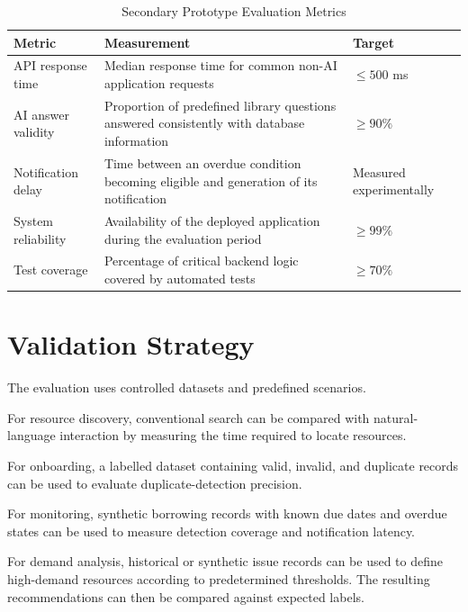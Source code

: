 \documentclass{tietreport}
\begin{document}
\begin{table}[H]
\centering
\caption{Secondary Prototype Evaluation Metrics}
\label{tab:secondarymetrics}

\begin{tabularx}{\textwidth}{>{\raggedright\arraybackslash}p{3.5cm}
                              X
                              >{\centering\arraybackslash}p{2.5cm}}
\toprule
\textbf{Metric} & \textbf{Measurement} & \textbf{Target} \\
\midrule

API response time &
Median response time for common non-AI application requests &
$\leq 500$ ms \\

AI answer validity &
Proportion of predefined library questions answered consistently with
database information &
$\geq 90\%$ \\

Notification delay &
Time between an overdue condition becoming eligible and generation of
its notification &
Measured experimentally \\

System reliability &
Availability of the deployed application during the evaluation period &
$\geq 99\%$ \\

Test coverage &
Percentage of critical backend logic covered by automated tests &
$\geq 70\%$ \\

\bottomrule
\end{tabularx}
\end{table}

\section{Validation Strategy}

The evaluation uses controlled datasets and predefined scenarios.

For resource discovery, conventional search can be compared with
natural-language interaction by measuring the time required to locate
resources.

For onboarding, a labelled dataset containing valid, invalid, and
duplicate records can be used to evaluate duplicate-detection precision.

For monitoring, synthetic borrowing records with known due dates and
overdue states can be used to measure detection coverage and notification
latency.

For demand analysis, historical or synthetic issue records can be used to
define high-demand resources according to predetermined thresholds. The
resulting recommendations can then be compared against expected labels.
\end{document}
